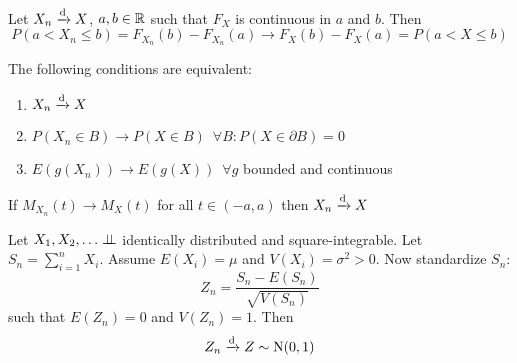 \documentclass[12pt]{extarticle}
\newcommand{\Normal}{{\operatorfont N}}
\newcommand{\convdist}{\xrightarrow{\operatorfont d}}
\begin{document}
\begin{proposition}
    Let $X_n \convdist X$, $a, b \in \mathbb{R}$ such that $F_X$ is continuous in $a$ and $b$.
    Then
    \begin{equation}
        P(a < X_n \leq b) = F_{X_n}(b) - F_{X_n}(a) \to F_X(b) - F_X(a) = P(a < X \leq b)
    \end{equation}
\end{proposition}

\begin{theorem}
    The following conditions are equivalent:
    \begin{enumerate}
        \item $X_n \convdist X$
        \item $P(X_n \in B) \to P(X \in B) \enspace \forall B: P(X \in \partial B) = 0$
        \item $E(g(X_n)) \to E(g(X)) \enspace \forall g$ bounded and continuous
    \end{enumerate}
\end{theorem}

\begin{theorem}
    If $M_{X_n}(t) \to M_X(t)$ for all $t \in (-a, a)$ then $X_n \convdist X$
\end{theorem}

\begin{theorem}
    Let $X_1, X_2, \ldots \perp \!\!\! \perp$ identically distributed and square-integrable.
    Let $S_n = \sum_{i = 1}^n X_i$.
    Assume $E(X_i) = \mu$ and $V(X_i) = \sigma^2 > 0$.
    Now standardize $S_n$:
    \begin{equation}
        Z_n = \frac{S_n - E(S_n)}{\sqrt{V(S_n)}}
    \end{equation}
    such that $E(Z_n) = 0$ and $V(Z_n) = 1$.
    Then
    \begin{equation}
        Z_n \convdist Z \sim \Normal(0, 1)
    \end{equation}
\end{theorem}
\end{document}
